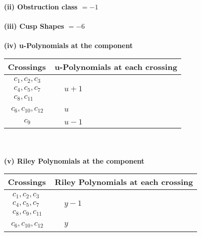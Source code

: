 \documentclass[1p]{elsarticle_modified}
\theoremstyle{definition}
\begin{document}
\flushleft \textbf{(ii) Obstruction class $= -1$}\\~\\
\flushleft \textbf{(iii) Cusp Shapes $= -6$}\\~\\
\newpage\renewcommand{\arraystretch}{1}
\flushleft \textbf{(iv) u-Polynomials at the component}\newline \\
\begin{tabular}{m{50pt}|m{274pt}}
Crossings & \hspace{64pt}u-Polynomials at each crossing \\
\hline $$\begin{aligned}c_{1},c_{2},c_{3}\\c_{4},c_{5},c_{7}\\c_{8},c_{11}\end{aligned}$$&$\begin{aligned}
&u+1
\end{aligned}$\\
\hline $$\begin{aligned}c_{6},c_{10},c_{12}\end{aligned}$$&$\begin{aligned}
&u
\end{aligned}$\\
\hline $$\begin{aligned}c_{9}\end{aligned}$$&$\begin{aligned}
&u-1
\end{aligned}$\\
\hline
\end{tabular}\\~\\
\newpage\renewcommand{\arraystretch}{1}
\flushleft \textbf{(v) Riley Polynomials at the component}\newline \\
\begin{tabular}{m{50pt}|m{274pt}}
Crossings & \hspace{64pt}Riley Polynomials at each crossing \\
\hline $$\begin{aligned}c_{1},c_{2},c_{3}\\c_{4},c_{5},c_{7}\\c_{8},c_{9},c_{11}\end{aligned}$$&$\begin{aligned}
&y-1
\end{aligned}$\\
\hline $$\begin{aligned}c_{6},c_{10},c_{12}\end{aligned}$$&$\begin{aligned}
&y
\end{aligned}$\\
\hline
\end{tabular}\\~\\
\end{document}

